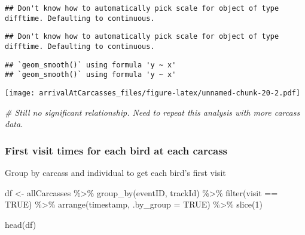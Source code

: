\documentclass[
]{article}
\newenvironment{Shaded}{\begin{snugshade}}{\end{snugshade}}
\newcommand{\AttributeTok}[1]{\textcolor[rgb]{0.77,0.63,0.00}{#1}}
\newcommand{\CommentTok}[1]{\textcolor[rgb]{0.56,0.35,0.01}{\textit{#1}}}
\newcommand{\ConstantTok}[1]{\textcolor[rgb]{0.00,0.00,0.00}{#1}}
\newcommand{\DecValTok}[1]{\textcolor[rgb]{0.00,0.00,0.81}{#1}}
\newcommand{\FunctionTok}[1]{\textcolor[rgb]{0.00,0.00,0.00}{#1}}
\newcommand{\NormalTok}[1]{#1}
\newcommand{\OtherTok}[1]{\textcolor[rgb]{0.56,0.35,0.01}{#1}}
\newcommand{\SpecialCharTok}[1]{\textcolor[rgb]{0.00,0.00,0.00}{#1}}
\begin{document}
\begin{verbatim}
## Don't know how to automatically pick scale for object of type difftime. Defaulting to continuous.
\end{verbatim}

\begin{verbatim}
## Don't know how to automatically pick scale for object of type difftime. Defaulting to continuous.
\end{verbatim}

\begin{verbatim}
## `geom_smooth()` using formula 'y ~ x'
## `geom_smooth()` using formula 'y ~ x'
\end{verbatim}

\texttt{[image: arrivalAtCarcasses\_files/figure-latex/unnamed-chunk-20-2.pdf]}

\begin{Shaded}
\begin{Highlighting}[]
\CommentTok{\# Still no significant relationship. Need to repeat this analysis with more carcass data.}
\end{Highlighting}
\end{Shaded}

\hypertarget{first-visit-times-for-each-bird-at-each-carcass}{%
\subsubsection{First visit times for each bird at each
carcass}\label{first-visit-times-for-each-bird-at-each-carcass}}

Group by carcass and individual to get each bird's first visit

\begin{Shaded}
\begin{Highlighting}[]
\NormalTok{df }\OtherTok{\textless{}{-}}\NormalTok{ allCarcasses }\SpecialCharTok{\%\textgreater{}\%}
  \FunctionTok{group\_by}\NormalTok{(eventID, trackId) }\SpecialCharTok{\%\textgreater{}\%}
  \FunctionTok{filter}\NormalTok{(visit }\SpecialCharTok{==} \ConstantTok{TRUE}\NormalTok{) }\SpecialCharTok{\%\textgreater{}\%}
  \FunctionTok{arrange}\NormalTok{(timestamp, }\AttributeTok{.by\_group =} \ConstantTok{TRUE}\NormalTok{) }\SpecialCharTok{\%\textgreater{}\%}
  \FunctionTok{slice}\NormalTok{(}\DecValTok{1}\NormalTok{) }

\FunctionTok{head}\NormalTok{(df)}
\end{Highlighting}
\end{Shaded}
\end{document}
